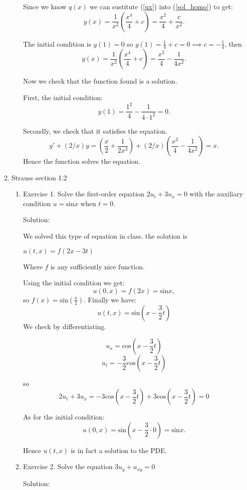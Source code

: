 \documentclass{article}
\begin{document}
\begin{enumerate}
\begin{enumerate}
		Since we know $q(x)$ we can sustitute (\ref{ux}) into (\ref{sol_homo}) to get:
		\[y(x) = \frac{1}{x^2}\left(\frac{x^4}{4}+c\right) = \frac{x^2}{4} + \frac{c}{x^2}.\]

		The initial condition is $y(1)=0$ so $y(1)=\frac{1}{4} + c= 0 \implies c=-\frac{1}{4}$,
		then
		\[y(x) = \frac{1}{x^2}\left(\frac{x^4}{4}+c\right) = \frac{x^2}{4} - \frac{1}{4x^2}.\]

		Now we check that the function found is a solution.

		First, the initial condition:
		\[y(1)= \frac{1^2}{4} - \frac{1}{4\cdot 1^2} =0.\]

		Secondly, we check that it satisfies the equation.
		\[y'+(2/x)y = \left(\frac{x}{2} + \frac{1}{2x^3}\right) +(2/x)\left(\frac{x^2}{4} - \frac{1}{4x^2}\right) = x.\]
		Hence the function solves the equation.


\end{enumerate}
\item Strauss section 1.2
	\begin{enumerate}
		\item Exercise 1. Solve the first-order equation
			$2u_t +3u_ x =0$ with the auxiliary condition $u=\text{sin}x$ when $t=0.$

			Solution:

			We solved this type of equation in class.
			the solution is 

			$u(t,x)=f(2x-3t)$

			Where $f$ is any sufficiently nice function.

			Using the initial condition we get:
			\[u(0,x)=f(2x)=\text{sin}x,\]
			so $f(x)=\text{sin}\left(\frac{x}{2}\right)$.
			Finally we have:
			\[u(t,x)=\text{sin}\left(x-\frac{3}{2}t\right)\]
			We check by differentiating.

			\[u_x=\text{cos}\left(x-\frac{3}{2}t\right)\]
			\[u_t=-\frac{3}{2}\text{cos}\left(x-\frac{3}{2}t\right)\]

			so
			\[ 2u_t +3u_x=-3\text{cos}\left(x-\frac{3}{2}t\right) + 3\text{cos}\left(x-\frac{3}{2}t\right)=0\]

			As for the initial condition:
			\[u(0,x)=\text{sin}\left(x-\frac{3}{2}\cdot0\right)=\text{sin}x.\]

			Hence $u(t,x)$ is in fact a solution to the PDE.

		\item Exercise 2. Solve the equation $3u_y + u_{xy} =0$

			Solution:


\end{enumerate}
\end{enumerate}
\end{document}
